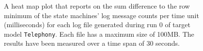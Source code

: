\begin{figure}[htbp]
\centering
\begin{minipage}{1\textwidth}
  \centering
\end{minipage}
\caption{A heat map plot that reports on the sum difference to the row minimum of the state machines' log message counts per time unit (milliseconds) for each log file generated during run 0 of target model \texttt{Telephony}. Each file has a maximum size of 100MB. The results have been measured over a time span of 30 seconds.}
\label{figure:throughput_difference_random_det_telephony_0}
\end{figure}